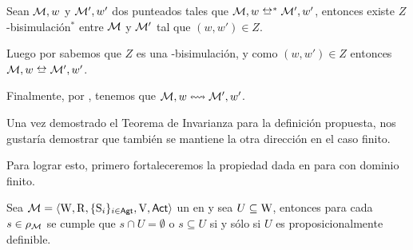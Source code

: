 \begin{demostracion}
    Sean $\mathcal{M},w$ y $\mathcal{M}',w'$ dos \ultss punteados tales que $\modults,w \bisim^* \modults',w'$, entonces existe $Z$ \KHilogic-bisimulación$^*$
    entre $\mathcal{M}$ y $\mathcal{M}'$ tal que $(w,w') \in Z$.
    
    Luego por  sabemos que $Z$ es una \KHilogic-bisimulación, y como $(w,w') \in Z$ entonces $\modults,w \bisim \modults',w'$.

    Finalmente, por , tenemos que $\mathcal{M},w \mathrel{\leftrightsquigarrow} \mathcal{M}',w'$.
\end{demostracion}

Una vez demostrado el Teorema de Invarianza para la definición propuesta, nos gustaría demostrar que también se mantiene la otra dirección en
el caso finito. 

Para lograr esto, primero fortaleceremos la propiedad dada en  para \ultss con dominio finito. 

\begin{lema}\label{lema:finite-propositionally-definable-lemma}
    Sea $\mathcal{M}=\langle \mathrm{W},\mathrm{R},\{ \mathrm{S}_i \}_{i \in {\rm \sf Agt}},\mathrm{V},{\rm \sf Act} \rangle$ un \ults en \MFD y sea $U \subseteq \mathrm{W}$, entonces
    para cada $s \in \rho_{\mathcal{M}}$ se cumple que $s \cap U = \emptyset$ o $s \subseteq U$ si y sólo si $U$ es proposicionalmente definible.
\end{lema}

